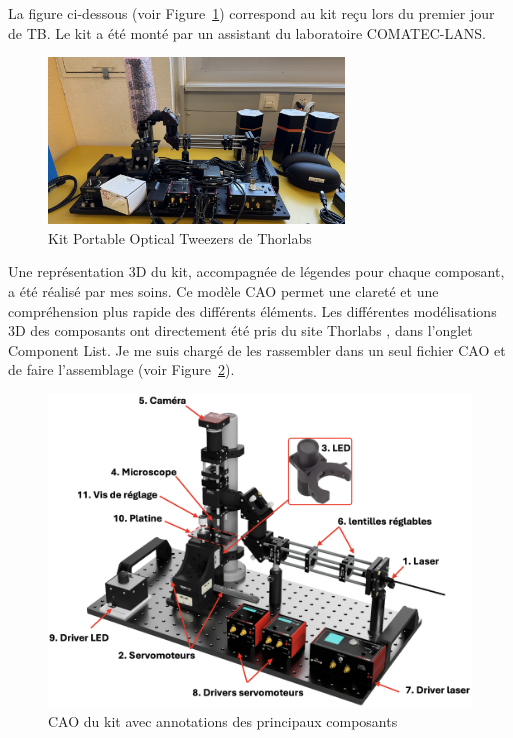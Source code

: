 La figure ci-dessous (voir Figure~\ref{kit_vierge}) correspond au kit reçu lors du premier jour de TB. Le kit a été monté par un assistant du laboratoire COMATEC-LANS.

\begin{figure}[H]
    \begin{center}
        \includegraphics[width=0.7\textwidth]{assets/figures/Introduction/kit_vierge.jpeg}
    \end{center}
    \caption{Kit Portable Optical Tweezers de Thorlabs}
    \label{kit_vierge}
\end{figure}

\newpage
Une représentation 3D du kit, accompagnée de légendes pour chaque composant, a été réalisé par mes soins. Ce modèle CAO permet une clareté et une compréhension plus rapide des différents éléments. Les différentes modélisations 3D des composants ont directement été pris du site Thorlabs \cite{portableOpticalTweezers}, dans l'onglet \guillemotleft Component List\guillemetright. Je me suis chargé de les rassembler dans un seul fichier CAO et de faire l'assemblage (voir Figure~\ref{kit_CAO_vierge_annote}).

\begin{figure}[H]
    \begin{center}
        \includegraphics[width=\textwidth]{assets/figures/Introduction/Kit_CAO_vierge_annote.png}
    \end{center}
    \caption{CAO du kit avec annotations des principaux composants}
    \label{kit_CAO_vierge_annote}
\end{figure}

